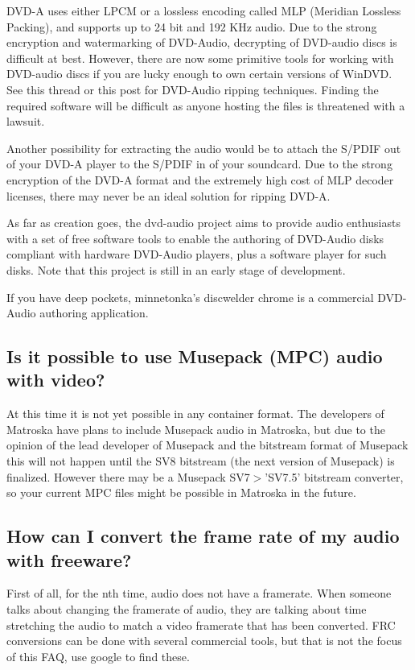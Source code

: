 ﻿\documentclass[12pt]{article}
\begin{document}
DVD-A uses either LPCM or a lossless encoding called MLP (Meridian Lossless Packing), and supports
up to 24 bit and 192 KHz audio. Due to the strong encryption and watermarking of DVD-Audio,
decrypting of DVD-audio discs is difficult at best. However, there are now some primitive tools for
working with DVD-audio discs if you are lucky enough to own certain versions of WinDVD. See this
thread or this post for DVD-Audio ripping techniques. Finding the required software will be
difficult as anyone hosting the files is threatened with a lawsuit.

Another possibility for extracting the audio would be to attach the S/PDIF out of your DVD-A player
to the S/PDIF in of your soundcard. Due to the strong encryption of the DVD-A format and the
extremely high cost of MLP decoder licenses, there may never be an ideal solution for ripping DVD-A.

As far as creation goes, the dvd-audio project aims to provide audio enthusiasts with a set of free
software tools to enable the authoring of DVD-Audio disks compliant with hardware DVD-Audio players,
plus a software player for such disks. Note that this project is still in an early stage of
development.

If you have deep pockets, minnetonka's discwelder chrome is a commercial DVD-Audio authoring
application.

\subsection{Is it possible to use Musepack (MPC) audio with video?}

At this time it is not yet possible in any container format. The developers of Matroska have plans
to include Musepack audio in Matroska, but due to the opinion of the lead developer of Musepack and
the bitstream format of Musepack this will not happen until the SV8 bitstream (the next version of
Musepack) is finalized. However there may be a Musepack SV7$>$'SV7.5' bitstream converter, so your
current MPC files might be possible in Matroska in the future.

\subsection{How can I convert the frame rate of my audio with freeware?}

First of all, for the nth time, audio does not have a framerate. When someone talks about changing
the framerate of audio, they are talking about time stretching the audio to match a video framerate
that has been converted. FRC conversions can be done with several commercial tools, but that is not
the focus of this FAQ, use google to find these.
\end{document}
